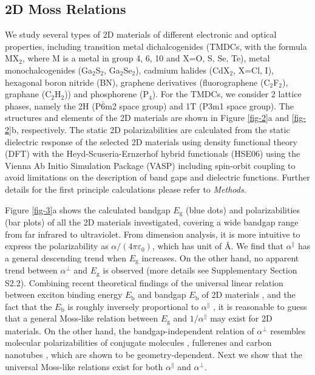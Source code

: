 \documentclass[journal=ancac3,manuscript=article,email=true,hyperref=true,keywords=false]{achemso}
\begin{document}
\subsection{2D Moss Relations}
\label{sec:first-principles}

We study several types of 2D materials of different electronic and
optical properties, including transition metal dichalcogenides (TMDCs,
with the formula MX\(_{\text{2}}\), where M is a metal in group 4, 6,
10 and X=O, S, Se, Te), metal monochalcogenides (Ga$_{2}$S$_{2}$,
Ga$_{2}$Se$_{2}$), cadmium halides (CdX$_2$, X=Cl, I), hexagonal boron
nitride (BN), graphene derivatives (fluorographene (C$_{2}$F$_{2}$),
graphane (C$_{2}$H$_{2}$)) and phosphorene (P$_{4}$).  For the TMDCs,
we consider 2 lattice phases, namely the 2H (P\(\bar{6}\)m2 space
group) and 1T (P3m1 space group).  The structures and elements of the
2D materials are shown in Figure \ref{fig-2}a and \ref{fig-2}b,
respectively. The static 2D polarizabilities are calculated from the
static dielectric response of the selected 2D materials using density
functional theory (DFT) with the Heyd-Scuseria-Ernzerhof hybrid
functionals (HSE06) using the Vienna Ab Initio Simulation Package (VASP)
including spin-orbit coupling to avoid limitations on the description
of band gaps and dielectric functions. Further details for the first
principle calculations please refer to \textit{Methods}.

Figure \ref{fig-3}a shows the calculated bandgap $E_{\mathrm{g}}$
(blue dots) and polarizabilities (bar plots) of all the 2D materials
investigated, covering a wide bandgap range from far infrared to
ultraviolet. From dimension analysis, it is more intuitive to express
the polarizability as $\alpha/(4 \pi \varepsilon_{0})$, which has unit
of \AA. We find that $\alpha^{\parallel}$ has a general descending
trend when $E_{\mathrm{g}}$ increases. On the other hand, no apparent
trend between $\alpha^{\perp}$ and $E_{\mathrm{g}}$ is observed (more
details see Supplementary Section S2.2).  Combining recent theoretical
findings of the universal linear relation between exciton binding
energy $E_{\mathrm{b}}$ and bandgap $E_{\mathrm{b}}$ of 2D materials
\cite{Choi_linear_2015,Olsen_2016_hydrogen,Jiang_2017_Eg_Eb}, and the
fact that the $E_{\mathrm{b}}$ is roughly inversely proportional to
$\alpha^{\parallel}$ \cite{Pulci_2014}, it is reasonable to guess that
a general Moss-like relation between $E_{\mathrm{g}}$ and
$1/\alpha^{\parallel}$ may exist for 2D materials. On the other hand,
the bandgap-independent relation of $\alpha^{\perp}$ resembles
molecular polarizabilities of conjugate molecules \cite{Davies_1952},
fullerenes \cite{Sabirov_2014} and carbon nanotubes
\cite{Benedict_1995}, which are shown to be geometry-dependent. Next
we show that the universal Moss-like relations exist for both
$\alpha^{\parallel}$ and $\alpha^{\perp}$.
\end{document}
